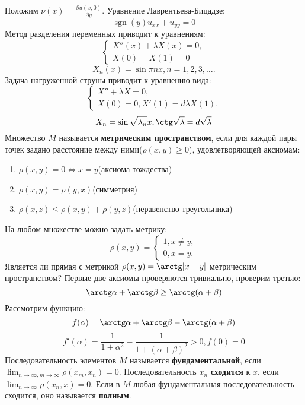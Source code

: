 \documentclass[11pt]{article}
\begin{document}
Положим $\nu(x) = \frac{\partial u(x, 0)}{\partial y}$.
Уравнение Лаврентьева-Бицадзе:
\begin{equation}
\operatorname{sgn}(y)u_{xx} + u_{yy} = 0
\end{equation}
Метод разделения переменных приводит к уравнениям:
\begin{equation}
\begin{cases}
X''(x) + \lambda X(x) = 0, \\
X(0) = X(1) = 0
\end{cases}
\end{equation}
\begin{equation}
X_n(x) = \sin \pi nx, n = 1, 2, 3, \ldots.
\end{equation}
Задача нагруженной струны приводит к уравнению вида:
\begin{equation}
\begin{cases}
X'' + \lambda X = 0, \\
X(0) = 0, X'(1) = d\lambda X(1).
\end{cases}
\end{equation}
\begin{equation}
X_n = \sin \sqrt{\lambda_n}x, \ctg\sqrt{\lambda} = d\sqrt{\lambda}
\end{equation}
Множество \(M\) называется \textbf{метрическим пространством}, если для каждой пары точек задано
расстояние между ними(\(\rho(x, y) \geq 0\)), удовлетворяющей аксиомам:
\begin{enumerate}
\item \(\rho(x, y) = 0 \Leftrightarrow x = y\)(аксиома тождества)
\item \(\rho(x, y) = \rho(y, x)\)(симметрия)
\item \(\rho(x, z) \leq \rho(x, y) + \rho(y, z)\)(неравенство треугольника)
\end{enumerate}
На любом множестве можно задать метрику:
\begin{equation}
\rho(x, y) = \begin{cases}
1, x \neq y, \\
0, x = y.
\end{cases}
\end{equation}
Является ли прямая с метрикой \(\rho(x, y) = \arctg|x - y|\) метрическим пространством?
Первые две аксиомы проверяются тривиально, проверим третью:
\begin{equation}
\arctg\alpha + \arctg\beta \geq \arctg(\alpha + \beta)
\end{equation}
Рассмотрим функцию:
\begin{equation}
f(\alpha) = \arctg\alpha + \arctg\beta - \arctg(\alpha + \beta)
\end{equation}
\begin{equation}
f'(\alpha) = \frac1{1 + \alpha^2} - \frac1{1 + (\alpha + \beta)^2} > 0, f(0) = 0
\end{equation}
Последовательность элементов $M$ называется \textbf{фундаментальной}, если
$\lim_{n \to \infty, m \to \infty}\rho(x_m, x_n) = 0$. Последовательность $x_n$ \textbf{сходится} к
$x$, если $\lim_{n \to \infty}\rho(x_n, x) = 0$. Если в $M$ любая фундаментальная последовательность
сходится, оно называется \textbf{полным}.
\end{document}
